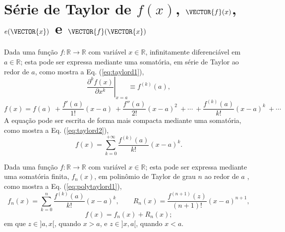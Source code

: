 
\section{Série de Taylor de $f(x)$, $\VECTOR{f}(x)$, $e(\VECTOR{x})$ e $\VECTOR{f}(\VECTOR{x})$}
\label{def:taylor}


\begin{proposition}\label{prop:taylord}
Dada uma função $f:\mathbb{R}\rightarrow \mathbb{R}$ com variável $x \in \mathbb{R}$,
infinitamente diferenciável em $a \in \mathbb{R}$;
esta pode ser expressa mediante uma somatória, em série de Taylor 
\cite[pp. 734]{stewart2008calculus} \cite[pp. 281]{telles2015matematica} \cite{Taylor} 
ao redor de $a$, como
mostra a Eq. (\ref{eq:taylord1}),%
\begin{equation}\label{eq:taylord0a}
\left.\frac{\partial^k f(x)}{\partial x^k}\right|_{x=a}\equiv f^{(k)}(a), 
\end{equation}
\begin{equation}\label{eq:taylord1}
  f(x)=f(a)
      ~+\frac{f'(a)}{1!} (x-a)
      ~+\frac{f''(a)}{2!} (x-a)^{2}
      ~+\cdots 
      ~+\frac{f^{(k)}(a)}{k!} (x-a)^{k}
      ~+\cdots 
\end{equation}
A equação pode ser escrita de forma mais compacta mediante uma somatória, como mostra a Eq. (\ref{eq:taylord2}),
\begin{equation}\label{eq:taylord2}
  f(x)=\sum\limits_{k=0}^{+\infty} \frac{f^{(k)}(a)}{k!} (x-a)^{k}.
\end{equation}
\end{proposition}

\begin{proposition}\label{prop:polytaylor}
Dada uma função $f:\mathbb{R}\rightarrow \mathbb{R}$ com variável $x \in \mathbb{R}$;
esta pode ser expressa mediante uma somatória finita, $f_n(x)$, 
em polinômio de Taylor de grau $n$ ao redor de $a$
\cite[pp. 737]{stewart2008calculus} \cite[pp. 285]{telles2015matematica}, 
 como mostra a Eq. (\ref{eq:polytaylord1}),
\begin{equation}\label{eq:polytaylord1}
  f_n(x)=\sum\limits_{k=0}^{n} \frac{f^{(k)}(a)}{k!} (x-a)^{k},
\qquad
R_n(x)=\frac{f^{(n+1)}(z)}{(n+1)!} (x-a)^{n+1},
\end{equation}
\begin{equation}\label{eq:polytaylord2}
f(x)= f_n(x) + R_n(x);
\end{equation}
em que $z \in ]a,x[$, quando $x>a$, e $z \in ]x,a[$, quando $x<a$.
\end{proposition}



